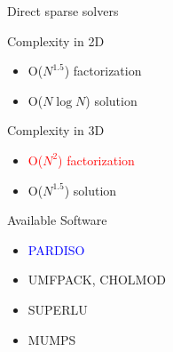 \documentclass[handout]{beamer}
{
\usepackage{fullpage}
\usepackage{hyperref}
\usepackage{amssymb} 
}
\newcommand{\red}[1]{\textcolor{red}{#1}}
\newcommand{\blue}[1]{\textcolor{blue}{#1}}
\begin{document}
\begin{frame}{Direct sparse solvers}

\begin{center}

\begin{minipage}{0.45\textwidth}
\begin{block}{Complexity in 2D}
  \begin{itemize}
  \item O($N^{1.5}$) factorization 
  \item O($N \log N$) solution
  \end{itemize}  
\end{block}
\end{minipage}
\hfill
\begin{minipage}{0.45\textwidth}
\begin{block}{Complexity in 3D}
  \begin{itemize}
  \item \red{O($N^{2}$) factorization}
  \item O($N^{1.5}$) solution
  \end{itemize}  
\end{block}
\end{minipage}

\bigskip

\bigskip

\begin{minipage}{0.6\textwidth}
Available Software
{\small
  \begin{itemize}
  \item \blue{PARDISO}
  \item UMFPACK, CHOLMOD
  \item SUPERLU
  \item MUMPS
  \end{itemize}  
}
\end{minipage}

\end{center}

\end{frame}
\end{document}
